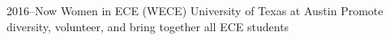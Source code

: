 \documentclass[]{friggeri-cv} %
\begin{document}
\begin{entrylist}

	\entry
	{2016--Now}
	{Women in ECE (WECE)}
	{University of Texas at Austin}
	{Promote diversity, volunteer, and bring together all ECE students}




















\end{entrylist}
\end{document}
